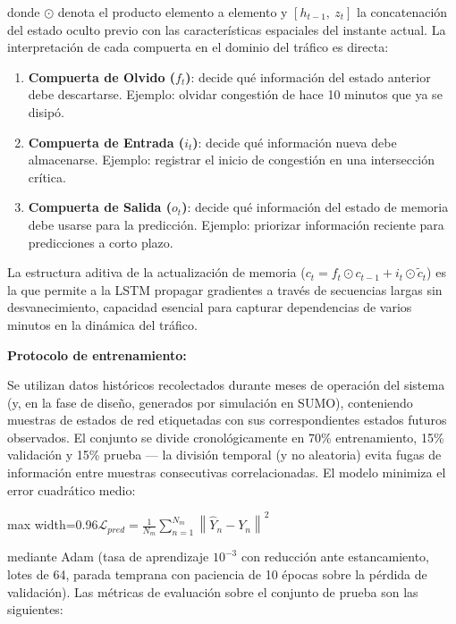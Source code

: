 \documentclass[12pt,a4paper,oneside]{report}
\newenvironment{centeredmath}
  {\begin{center}\begin{adjustbox}{max width=0.96\linewidth}\(\displaystyle}
  {\)\end{adjustbox}\end{center}}
\begin{document}
donde \(\odot\) denota el producto elemento a elemento y \([h_{t-1},\ z_{t}]\) la concatenación del estado oculto previo con las características espaciales del instante actual. La interpretación de cada compuerta en el dominio del tráfico es directa:

\begin{enumerate}
\def\labelenumi{\arabic{enumi}.}
\item
  \textbf{Compuerta de Olvido (\(f_{t}\))}: decide qué información del estado anterior debe descartarse. Ejemplo: olvidar congestión de hace 10 minutos que ya se disipó.
\item
  \textbf{Compuerta de Entrada (\(i_{t}\))}: decide qué información nueva debe almacenarse. Ejemplo: registrar el inicio de congestión en una intersección crítica.
\item
  \textbf{Compuerta de Salida (\(o_{t}\))}: decide qué información del estado de memoria debe usarse para la predicción. Ejemplo: priorizar información reciente para predicciones a corto plazo.
\end{enumerate}

La estructura aditiva de la actualización de memoria (\(c_{t} = f_{t} \odot c_{t-1} + i_{t} \odot \tilde{c}_{t}\)) es la que permite a la LSTM propagar gradientes a través de secuencias largas sin desvanecimiento, capacidad esencial para capturar dependencias de varios minutos en la dinámica del tráfico.

\textbf{Protocolo de entrenamiento:}

Se utilizan datos históricos recolectados durante meses de operación del sistema (y, en la fase de diseño, generados por simulación en SUMO), conteniendo muestras de estados de red etiquetadas con sus correspondientes estados futuros observados. El conjunto se divide cronológicamente en 70\% entrenamiento, 15\% validación y 15\% prueba --- la división temporal (y no aleatoria) evita fugas de información entre muestras consecutivas correlacionadas. El modelo minimiza el error cuadrático medio:

\begin{centeredmath}
\mathcal{L}_{pred} = \frac{1}{N_{m}}\sum_{n = 1}^{N_{m}}\left\| \widehat{Y}_{n} - Y_{n} \right\|^{2}
\end{centeredmath}

mediante Adam (tasa de aprendizaje \(10^{-3}\) con reducción ante estancamiento, lotes de 64, parada temprana con paciencia de 10 épocas sobre la pérdida de validación). Las métricas de evaluación sobre el conjunto de prueba son las siguientes:
\end{document}
